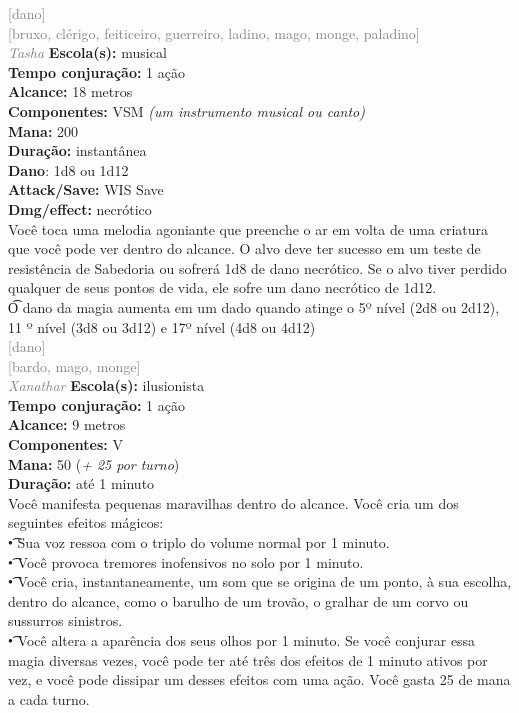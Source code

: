 \documentclass{RPG_Adventure}[2021/10/20]
\begin{document}
{\scriptsize \textcolor{gray}{[dano]\\}}
{\scriptsize \textcolor{gray}{[bruxo, clérigo, feiticeiro, guerreiro, ladino, mago, monge, paladino]\\}}
{\tiny \textcolor{gray}{\textit{Tasha}}}
{\small \t \textbf{Escola(s):} musical\\\t \textbf{Tempo conjuração:} 1 ação\\\t \textbf{Alcance:} 18 metros\\\t \textbf{Componentes:} VSM \textit{(um instrumento musical ou canto)}\\\t \textbf{Mana:} 200\\\t \textbf{Duração:} instantânea\\\t \textbf{Dano}: 1d8 ou 1d12\\\t \textbf{Attack/Save:} WIS Save\\\t \textbf{Dmg/effect:} necrótico\\}
{\normalsize Você toca uma melodia agoniante que preenche o ar em volta de uma criatura que você pode ver dentro do alcance. O alvo deve ter sucesso em um teste de resistência de Sabedoria ou sofrerá 1d8 de dano necrótico. Se o alvo tiver perdido qualquer de seus pontos de vida, ele sofre um dano necrótico de 1d12.\\\t O dano da magia aumenta em um dado quando atinge o 5º nível (2d8 ou 2d12), 11 º nível (3d8 ou 3d12) e 17º nível (4d8 ou 4d12)\\}
{\scriptsize \textcolor{gray}{[dano]\\}}
{\scriptsize \textcolor{gray}{[bardo, mago, monge]\\}}
{\tiny \textcolor{gray}{\textit{Xanathar}}}
{\small \t \textbf{Escola(s):} ilusionista\\\t \textbf{Tempo conjuração:} 1 ação\\\t \textbf{Alcance:} 9 metros\\\t \textbf{Componentes:} V\\\t \textbf{Mana:} 50 (\textit{+ 25 por turno})\\\t \textbf{Duração:} até 1 minuto\\}
{\normalsize Você manifesta pequenas maravilhas dentro do alcance. Você cria um dos seguintes efeitos mágicos:\\\t • Sua voz ressoa com o triplo do volume normal por 1 minuto.\\\t • Você provoca tremores inofensivos no solo por 1 minuto.\\\t • Você cria, instantaneamente, um som que se origina de um ponto, à sua escolha, dentro do alcance, como o barulho de um trovão, o gralhar de um corvo ou sussurros sinistros.\\\t • Você altera a aparência dos seus olhos por 1 minuto.  Se você conjurar essa magia diversas vezes, você pode ter até três dos efeitos de 1 minuto ativos por vez, e você pode dissipar um desses efeitos com uma ação. Você gasta 25 de mana a cada turno.\\}
\end{document}

